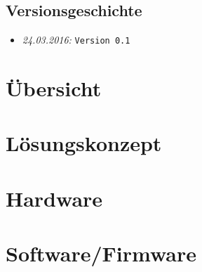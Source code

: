 \documentclass{fhnwreport/fhnwreport}
\begin{document}


\tableofcontents
\vspace{80mm}
\subsection*{Versionsgeschichte}
\begin{itemize}
    \item[]
        \emph{24.03.2016:} \texttt{Version 0.1}
\end{itemize}
\clearpage

\section{\"Ubersicht}
\label{sec:ubersicht}


%

\clearpage
\section{L\"osungskonzept}
\label{sec:losungskonzept}


\clearpage
\section{Hardware}
\label{sec:hardware}


\clearpage
\section{Software/Firmware}
\label{sec:software}

\end{document}
